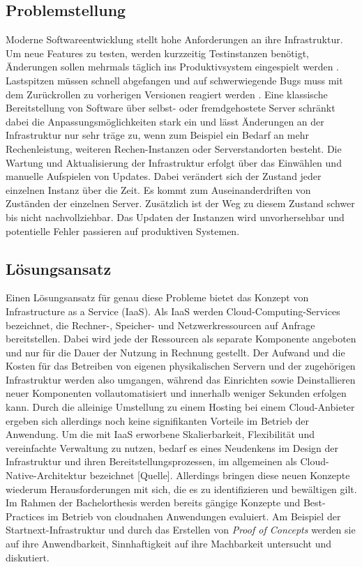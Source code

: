 \documentclass[11pt]{scrartcl}
\begin{document}
\subsection{Problemstellung}
Moderne Softwareentwicklung stellt hohe Anforderungen an ihre Infrastruktur. Um neue Features zu testen, werden kurzzeitig Testinstanzen benötigt, Änderungen sollen mehrmals täglich ins Produktivsystem eingespielt werden \cite{IBM:2019}. Lastspitzen müssen schnell abgefangen und auf schwerwiegende Bugs muss mit dem Zurückrollen zu vorherigen Versionen reagiert werden \cite{Mikkelsen:2019}. Eine klassische Bereitstellung von Software über selbst- oder fremdgehostete Server schränkt dabei die Anpassungsmöglichkeiten stark ein und lässt Änderungen an der Infrastruktur nur sehr träge zu, wenn zum Beispiel ein Bedarf an mehr Rechenleistung, weiteren Rechen-Instanzen oder Serverstandorten besteht. \newline 
Die Wartung und Aktualisierung der Infrastruktur erfolgt über das Einwählen und manuelle Aufspielen von Updates. Dabei verändert sich der Zustand jeder einzelnen Instanz über die Zeit. Es kommt zum Auseinanderdriften von Zuständen der einzelnen Server. Zusätzlich ist der Weg zu diesem Zustand schwer bis nicht nachvollziehbar. Das Updaten der Instanzen wird unvorhersehbar und potentielle Fehler passieren auf produktiven Systemen.

\subsection{Lösungsansatz}
Einen Lösungsansatz für genau diese Probleme bietet das Konzept von Infrastructure as a Service (IaaS). Als IaaS werden Cloud-Computing-Services bezeichnet, die Rechner-, Speicher- und Netzwerkressourcen auf Anfrage bereitstellen. Dabei wird jede der Ressourcen als separate Komponente angeboten und nur für die Dauer der Nutzung in Rechnung gestellt. Der Aufwand und die Kosten für das Betreiben von eigenen physikalischen Servern und der zugehörigen Infrastruktur werden also umgangen, während das Einrichten sowie Deinstallieren neuer Komponenten vollautomatisiert und innerhalb weniger Sekunden erfolgen kann.\newline
Durch die alleinige Umstellung zu einem Hosting bei einem Cloud-Anbieter ergeben sich allerdings noch keine signifikanten Vorteile im Betrieb der Anwendung. Um die mit IaaS erworbene Skalierbarkeit, Flexibilität und vereinfachte Verwaltung zu nutzen, bedarf es eines Neudenkens im Design der Infrastruktur und ihren Bereitstellungsprozessen, im allgemeinen als Cloud-Native-Architektur bezeichnet [Quelle]. Allerdings bringen diese neuen Konzepte wiederum Herausforderungen mit sich, die es zu identifizieren und bewältigen gilt. \newline 
Im Rahmen der Bachelorthesis werden bereits gängige Konzepte und \glqq Best-Practices\grqq{} im Betrieb von cloudnahen Anwendungen evaluiert. Am Beispiel der Startnext-Infrastruktur und durch das Erstellen von \textit{Proof of Concepts} werden sie auf ihre Anwendbarkeit, Sinnhaftigkeit auf ihre Machbarkeit untersucht und diskutiert.
\end{document}
